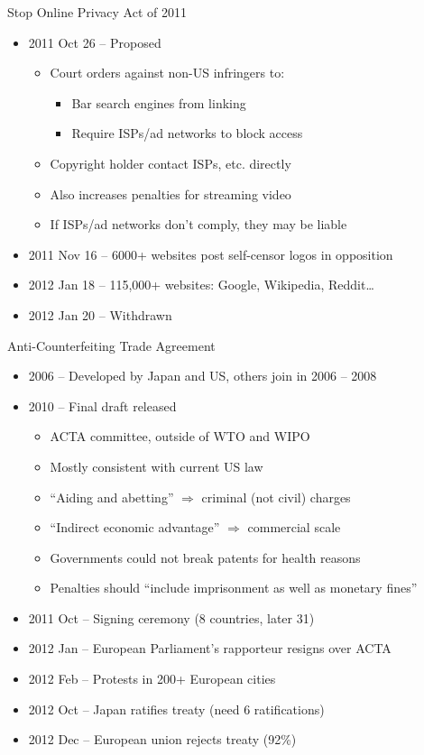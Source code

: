 \documentclass{beamer}
\begin{document}
\begin{frame}{Stop Online Privacy Act of 2011}
\begin{itemize}
\item 2011 Oct 26 -- Proposed
\begin{itemize}
\item Court orders against non-US infringers to:
\begin{itemize}
\item Bar search engines from linking
\item Require ISPs/ad networks to block access
\end{itemize}
\item Copyright holder contact ISPs, etc. directly
\item Also increases penalties for streaming video
\item If ISPs/ad networks don't comply, they may be liable
\end{itemize}
\item 2011 Nov 16 -- 6000+ websites post self-censor logos in opposition
\item 2012 Jan 18 -- 115,000+ websites: Google, Wikipedia, Reddit\ldots
\item 2012 Jan 20 -- Withdrawn
\end{itemize}
\end{frame}

\begin{frame}{Anti-Counterfeiting Trade Agreement}
\begin{itemize}
\item 2006 -- Developed by Japan and US, others join in 2006 -- 2008
\item 2010 -- Final draft released
\begin{itemize}
\item ACTA committee, outside of WTO and WIPO
\item Mostly consistent with current US law
\item ``Aiding and abetting'' $\Rightarrow$ criminal (not civil) charges
\item ``Indirect economic advantage'' $\Rightarrow$ commercial scale
\item Governments could not break patents for health reasons
\item Penalties should ``include imprisonment as well as monetary fines''
\end{itemize}
\item 2011 Oct -- Signing ceremony (8 countries, later 31)
\item 2012 Jan -- European Parliament's rapporteur resigns over ACTA
\item 2012 Feb -- Protests in 200+ European cities
\item 2012 Oct -- Japan ratifies treaty (need 6 ratifications)
\item 2012 Dec -- European union rejects treaty (92\%)
\end{itemize}
\end{frame}
\end{document}
